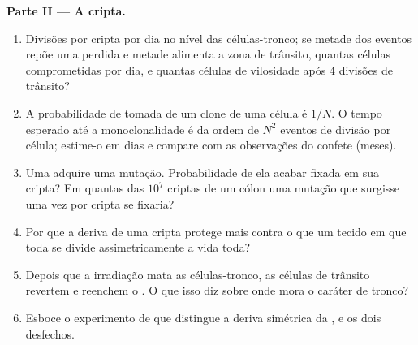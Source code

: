 \begin{problem}
\medskip
\noindent\textbf{Parte II --- A cripta.}
\begin{enumerate}[resume]
  \item Divisões por cripta por dia no nível das células-tronco; se
        metade dos eventos repõe uma  perdida e metade
        alimenta a zona de trânsito, quantas células comprometidas por
        dia, e quantas células de vilosidade após $4$ divisões de
        trânsito?
  \item A probabilidade de tomada de um clone de uma célula é $1/N$. O
        tempo esperado até a monoclonalidade é da ordem de $N^{2}$ eventos
        de divisão por célula; estime-o em dias e compare com as
        observações do confete (meses).
  \item Uma  adquire uma mutação. Probabilidade de ela
        acabar fixada em sua cripta? Em quantas das $10^{7}$ criptas de
        um cólon uma mutação que surgisse uma vez por cripta se fixaria?
  \item Por que a deriva de uma cripta protege mais contra o  que
        um tecido em que toda  se divide assimetricamente a
        vida toda?
  \item Depois que a irradiação mata as células-tronco, as células de
        trânsito revertem e reenchem o . O que isso diz sobre onde
        mora o caráter de tronco?
  \item Esboce o experimento de  que distingue a
        deriva simétrica da , e os dois desfechos.
\end{enumerate}


\end{problem}
